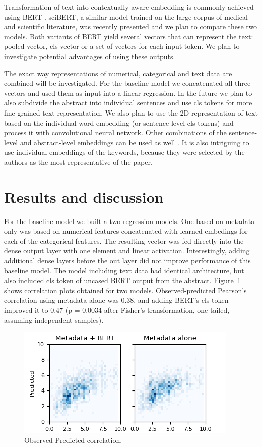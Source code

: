 \documentclass[11pt]{article}
\begin{document}
Transformation of text into contextually-aware embedding is commonly achieved using BERT \citep{DBLP:journals/corr/abs-1810-04805}. sciBERT, a similar model trained on the large corpus of medical and scientific literature, was recently presented \citep{DBLP:journals/corr/abs-1903-10676} and we plan to compare these two models. Both variants of BERT yield several vectors that can represent the text: pooled vector, cls vector or a set of vectors for each input token. We plan to investigate potential advantages of using these outputs. 

The exact way representations of numerical, categorical and text data are combined will be investigated. For the baseline model we concatenated all three vectors and used them as input into a linear regression. In the future we plan to also subdivide the abstract into individual sentences and use cls tokens for more fine-grained text representation. We also plan to use the 2D-representation of text based on the individual word embedding (or sentence-level cls tokens) and process it with convolutional  neural network. Other combinations of the sentence-level and abstract-level embeddings can be used as well \citep{hs2022}. It is also intriguing to use individual embeddings of the keywords, because they were selected by the authors as the most representative of the paper.

\section{Results and discussion}
For the baseline model we built a two regression models. One based on metadata only was based on numerical features concatenated with learned embedings for each of the categorical features. The resulting vector was fed directly into the dense output layer with one element and linear activation. Interestingly, adding additional dense layers before the out layer did not improve performance of this baseline model. The model including text data had identical architecture, but also included cls token of uncased BERT output from the abstract. Figure~\ref{fig:meta_no_meta} shows correlation plots obtained for two models. Observed-predicted Pearson's correlation using metadata alone was 0.38, and adding BERT's cls token improved it to 0.47 (p = 0.0034 after Fisher's transformation, one-tailed, assuming independent samples). 
\begin{figure}
	\includegraphics[width= \columnwidth]{./Images/Metadata w BERT.png}
	\caption{Observed-Predicted correlation.}
	\label{fig:meta_no_meta}
\end{figure}
\end{document}
